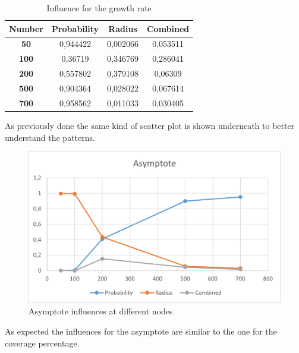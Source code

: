 \begin{table}[H]
\centering
\begin{tabular}{|c|c|c|c|}
\hline
\textbf{Number} & \textbf{Probability} & \textbf{Radius} & \textbf{Combined} \\ \hline
\textbf{50} & 0,944422 & 0,002066 & 0,053511 \\ \hline
\textbf{100} & 0,36719 & 0,346769 & 0,286041 \\ \hline
\textbf{200} & 0,557802 & 0,379108 & 0,06309 \\ \hline
\textbf{500} & 0,904364 & 0,028022 & 0,067614 \\ \hline
\textbf{700} & 0,958562 & 0,011033 & 0,030405 \\ \hline
\end{tabular}
\caption{Influence for the growth rate}
\end{table}

As previously done the same kind of scatter plot is shown underneath to better understand the patterns.

\begin{figure}[H]\label{pic:test}
\centering
    \includegraphics[width= 1\textwidth]{./images/AsymptoteWithNodes.png}
    \caption{Asymptote influences at different nodes}
    \label{fig:immagine}
\end{figure}

As expected the influences for the asymptote are similar to the one for the coverage percentage.

